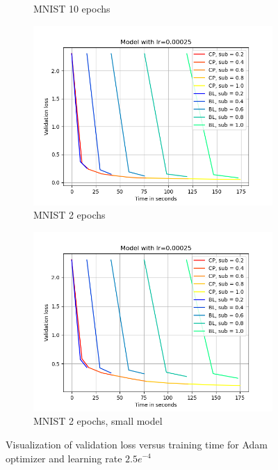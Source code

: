 \begin{figure}[h]
\begin{subfigure}[b]{0.24\textwidth}
        \caption{MNIST 10 epochs}
        \label{fig:1b}
    \end{subfigure}
    \begin{subfigure}[b]{0.24\textwidth}
        \centering
        \includegraphics[width=\textwidth]{figures/22_07/2ep/loss_time_0.00025.png}
        \caption{MNIST 2 epochs}
        \label{fig:1c}
    \end{subfigure}
    \begin{subfigure}[b]{0.24\textwidth}
        \centering
        \includegraphics[width=\textwidth]{figures/22_07/2ep_smaller/loss_time_0.00025.png}
        \caption{MNIST 2 epochs, small model}
        \label{fig:1d}
    \end{subfigure}
    \caption{Visualization of validation loss versus training time for Adam optimizer and learning rate $2.5e^{-4}$}
    \label{fig:three graphs}
\end{figure}



